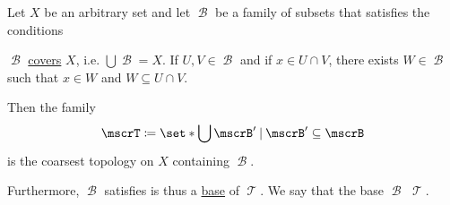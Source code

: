 \begin{proposition}\label{thm:topology_from_base}
  Let \( X \) be an arbitrary set and let \( \mscrB \) be a family of subsets that satisfies the conditions
  \begin{thmenum}
     \( \mscrB \) \hyperref[def:set_cover]{covers} \( X \), i.e. \( \bigcup \mscrB = X \).
     If \( U, V \in \mscrB \) and if \( x \in U \cap V \), there exists \( W \in \mscrB \) such that \( x \in W \) and \( W \subseteq U \cap V \).
  \end{thmenum}

  Then the family
  \begin{equation}\label{eq:thm:topology_from_base/topology}
    \mscrT \coloneqq \set*{ \bigcup \mscrB' \given \mscrB' \subseteq \mscrB }
  \end{equation}
  is the coarsest topology on \( X \) containing \( \mscrB \).

  Furthermore, \( \mscrB \) satisfies  is thus a \hyperref[def:topological_base]{base} of \( \mscrT \). We say that the base \( \mscrB \)  \( \mscrT \).
\end{proposition}
